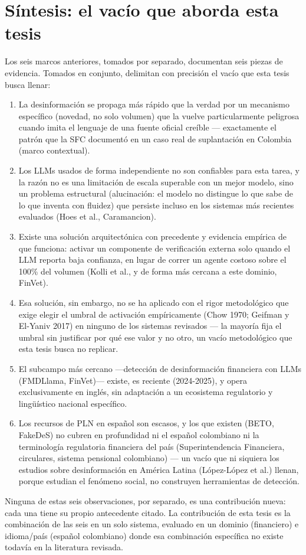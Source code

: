\section{Síntesis: el vacío que aborda esta tesis}

Los seis marcos anteriores, tomados por separado, documentan seis piezas de evidencia. Tomados en conjunto, delimitan con precisión el vacío que esta tesis busca llenar:

\begin{enumerate}
    \item La desinformación se propaga más rápido que la verdad por un mecanismo específico (novedad, no solo volumen) que la vuelve particularmente peligrosa cuando imita el lenguaje de una fuente oficial creíble — exactamente el patrón que la SFC documentó en un caso real de suplantación en Colombia (marco contextual).
    \item Los LLMs usados de forma independiente no son confiables para esta tarea, y la razón no es una limitación de escala superable con un mejor modelo, sino un problema estructural (alucinación: el modelo no distingue lo que sabe de lo que inventa con fluidez) que persiste incluso en los sistemas más recientes evaluados (Hoes et al., Caramancion).
    \item Existe una solución arquitectónica con precedente y evidencia empírica de que funciona: activar un componente de verificación externa solo quando el LLM reporta baja confianza, en lugar de correr un agente costoso sobre el 100\% del volumen (Kolli et al., y de forma más cercana a este dominio, FinVet).
    \item Esa solución, sin embargo, no se ha aplicado con el rigor metodológico que exige elegir el umbral de activación empíricamente (Chow 1970; Geifman y El-Yaniv 2017) en ninguno de los sistemas revisados — la mayoría fija el umbral sin justificar por qué ese valor y no otro, un vacío metodológico que esta tesis busca no replicar.
    \item El subcampo más cercano —detección de desinformación financiera con LLMs (FMDLlama, FinVet)— existe, es reciente (2024-2025), y opera exclusivamente en inglés, sin adaptación a un ecosistema regulatorio y lingüístico nacional específico.
    \item Los recursos de PLN en español son escasos, y los que existen (BETO, FakeDeS) no cubren en profundidad ni el español colombiano ni la terminología regulatoria financiera del país (Superintendencia Financiera, circulares, sistema pensional colombiano) — un vacío que ni siquiera los estudios sobre desinformación en América Latina (López-López et al.) llenan, porque estudian el fenómeno social, no construyen herramientas de detección.
\end{enumerate}

Ninguna de estas seis observaciones, por separado, es una contribución nueva: cada una tiene su propio antecedente citado. La contribución de esta tesis es la combinación de las seis en un solo sistema, evaluado en un dominio (financiero) e idioma/país (español colombiano) donde esa combinación específica no existe todavía en la literatura revisada.

